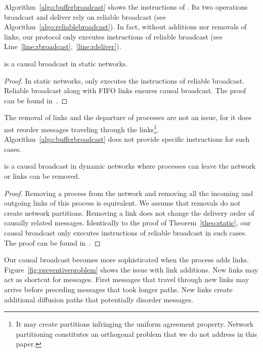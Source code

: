 Algorithm~\ref{algo:bufferbroadcast} shows the instructions of \CBROADCAST. Its
two operations broadcast and deliver rely on reliable broadcast (see
Algorithm~\ref{algo:reliablebroadcast}). In fact, without additions nor removals
of links, our protocol only executes instructions of reliable broadcast (see
Line~\ref{line:rbroadcast},~\ref{line:rdeliver}).

\begin{theorem}
  \CBROADCAST is a causal broadcast in static networks.
\end{theorem}

\begin{proof}
  In static networks, \CBROADCAST only executes the instructions of reliable
  broadcast. Reliable broadcast along with FIFO links ensures causal broadcast.
  The proof can be found in~\cite{friedman2004causal}.
\end{proof}

The removal of links and the departure of processes are not an issue, for it
does not reorder messages traveling through the links\footnote{It may create
  partitions infringing the uniform agreement property. Network partitioning
  constitutes an orthogonal problem that we do not address in this
  paper.}. Algorithm~\ref{algo:bufferbroadcast} does not provide specific
instructions for such cases.

\begin{lemma}
  \CBROADCAST is a causal broadcast in dynamic networks where processes can
  leave the network or links can be removed.
\end{lemma}

\begin{proof}
  Removing a process from the network and removing all the incoming and outgoing
  links of this process is equivalent. We assume that removals do not create
  network partitions.  Removing a link does not change the delivery order of
  causally related messages. Identically to the proof of
  Theorem~\ref{theo:static}, our causal broadcast only executes instructions of
  reliable broadcast in such cases. The proof can be found
  in~\cite{friedman2004causal}.
\end{proof}

Our causal broadcast becomes more sophisticated when the process adds links.
Figure~\ref{fig:preventiveproblem} shows the issue with link additions.  New
links may act as shortcut for messages. First messages that travel through new
links may arrive before preceding messages that took longer paths. New links
create additional diffusion paths that potentially disorder messages. 

